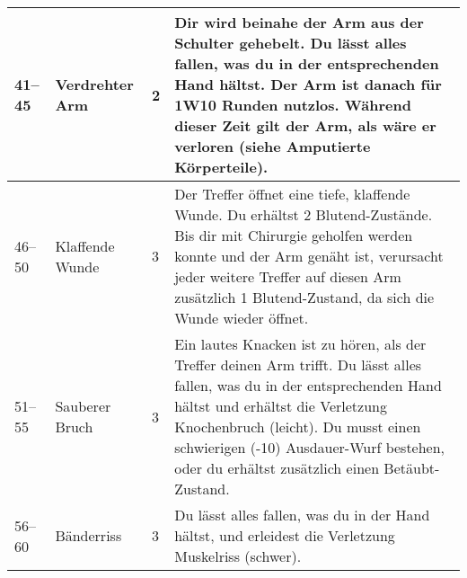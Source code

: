 \documentclass[a4paper, fontsize=8.5pt]{scrartcl}
\begin{document}
\begin{table}[!ht]
\begin{tabularx}{\textwidth}{lp{2.5cm}lX}
        41–45         & Verdrehter Arm             & 2           & Dir wird beinahe der Arm aus der Schulter gehebelt. Du lässt alles fallen, was du in der entsprechenden Hand hältst. Der Arm ist danach für 1W10 Runden nutzlos. Während dieser Zeit gilt der Arm, als wäre er verloren (siehe Amputierte Körperteile).                                                                                                                                                                                                                                                                                                                                                                                                    \\ \hline
        46–50         & Klaffende Wunde            & 3           & Der Treffer öffnet eine tiefe, klaffende Wunde. Du erhältst 2 Blutend-Zustände. Bis dir mit Chirurgie geholfen werden konnte und der Arm genäht ist, verursacht jeder weitere Treffer auf diesen Arm zusätzlich 1 Blutend-Zustand, da sich die Wunde wieder öffnet.                                                                                                                                                                                                                                                                                                                                                                                        \\ \hline
        51–55         & Sauberer Bruch             & 3           & Ein lautes Knacken ist zu hören, als der Treffer deinen Arm trifft. Du lässt alles fallen, was du in der entsprechenden Hand hältst und erhältst die Verletzung Knochenbruch (leicht). Du musst einen schwierigen (-10) Ausdauer-Wurf bestehen, oder du erhältst zusätzlich einen Betäubt-Zustand.                                                                                                                                                                                                                                                                                                                                                         \\ \hline
        56–60         & Bänderriss                 & 3           & Du lässt alles fallen, was du in der Hand hältst, und erleidest die Verletzung Muskelriss (schwer).                                                                                                                                                                                                                                                                                                                                                                                                                                                                                                                                                        \\ \hline

\end{tabularx}
\end{table}
\end{document}
